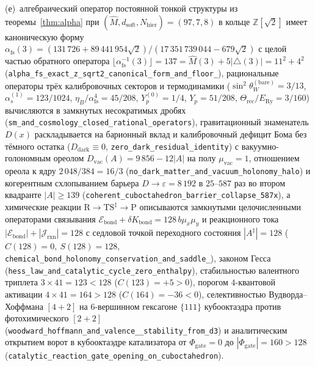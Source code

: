 \begin{enumerate}[nosep,leftmargin=*]
  (е)~алгебраический оператор постоянной тонкой структуры из теоремы~\ref{thm:alpha} при $(\hat M,d_{\mathrm{soft}},N_{\mathrm{hier}})=(97,7,8)$ в кольце $\mathbb{Z}[\sqrt{2}]$ имеет каноническую форму $\alpha_{\mathrm{fs}}(3) = (131\,726 + 89\,441\,954\sqrt{2})/(17\,351\,739\,044 - 679\sqrt{2})$ с целой частью обратного оператора $\lfloor\alpha_{\mathrm{fs}}^{-1}(3)\rfloor = 137 = \hat M(3) + 5|\triangle(3)| = 11^2 + 4^2$ (\texttt{alpha\_\allowbreak fs\_\allowbreak exact\_\allowbreak z\_\allowbreak sqrt2\_\allowbreak canonical\_\allowbreak form\_\allowbreak and\_\allowbreak floor\_}), рациональные операторы трёх калибровочных секторов и термодинамики ($\sin^2\theta_W^{(\mathrm{bare})}=3/13$, $\alpha_s^{(1)}=123/1024$, $\eta_B/\alpha_{\mathrm{fs}}^4=45/208$, $Y_p^{(0)}=1/4$, $Y_p=51/208$, $\Theta_{\mathrm{rec}}/E_{\mathrm{Ry}}=3/160$) вычисляются в замкнутых несократимых дробях (\texttt{sm\_\allowbreak and\_\allowbreak cosmology\_\allowbreak closed\_\allowbreak rational\_\allowbreak operators}), гравитационный знаменатель $D(x)$ раскладывается на барионный вклад и калибровочный дефицит Бома без тёмного остатка ($D_{\mathrm{dark}}\equiv 0$, \texttt{zero\_\allowbreak dark\_\allowbreak residual\_\allowbreak identity}) с вакуумно-голономным ореолом $D_{\mathrm{vac}}(A) = 9\,856 - 12|A|$ на полу $\mu_{\mathrm{vac}}=1$, отношением ореола к ядру $2\,048/384 = 16/3$ (\texttt{no\_\allowbreak dark\_\allowbreak matter\_\allowbreak and\_\allowbreak vacuum\_\allowbreak holonomy\_\allowbreak halo}) и когерентным схлопыванием барьера $D\to\varepsilon=8\,192$ в $25\text{--}587$ раз во втором квадранте $|A|\ge 139$ (\texttt{coherent\_\allowbreak cuboctahedron\_\allowbreak barrier\_\allowbreak collapse\_\allowbreak 587x}), а химические реакции $\mathrm{R}\to\mathrm{TS}^\ddagger\to\mathrm{P}$ описываются замкнутыми целочисленными операторами связывания $\mathcal{E}_{\mathrm{bond}} + \delta K_{\mathrm{bond}} = 128\,b\mu_x\mu_y$ и реакционного тока $|\mathcal{E}_{\mathrm{bond}}| + |\mathcal{J}_{\mathrm{rxn}}| = 128$ с седловой точкой переходного состояния $|A^\ddagger|=128$ ($C(128)=0,\ S(128)=128$, \texttt{chemical\_\allowbreak bond\_\allowbreak holonomy\_\allowbreak conservation\_\allowbreak and\_\allowbreak saddle\_}), законом Гесса (\texttt{hess\_\allowbreak law\_\allowbreak and\_\allowbreak catalytic\_\allowbreak cycle\_\allowbreak zero\_\allowbreak enthalpy}), стабильностью валентного триплета $3\times 41 = 123 < 128$ ($C(123)=+5>0$), порогом $4$-квантовой активации $4\times 41 = 164 > 128$ ($C(164)=-36<0$), селективностью Вудворда--Хоффмана $[4+2]$ на $6$-вершинном гексагоне $\{111\}$ кубооктаэдра против фотохимического $[2+2]$ (\texttt{woodward\_\allowbreak hoffmann\_\allowbreak and\_\allowbreak valence\_\_\allowbreak stability\_\allowbreak from\_\allowbreak d3}) и аналитическим открытием ворот в кубооктаэдре катализатора от $\Phi_{\mathrm{gate}}=0$ до $|\Phi_{\mathrm{gate}}|=160 > 128$ (\texttt{catalytic\_\allowbreak reaction\_\allowbreak gate\_\allowbreak opening\_\allowbreak on\_\allowbreak cuboctahedron}).

\end{enumerate}
